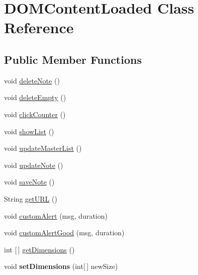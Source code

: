 \hypertarget{class_d_o_m_content_loaded}{}\section{D\+O\+M\+Content\+Loaded Class Reference}
\label{class_d_o_m_content_loaded}
\subsection*{Public Member Functions}
\begin{DoxyCompactItemize}
\item 
void \hyperlink{class_d_o_m_content_loaded_a08ab37a8c435636cf376a8748dce6f25}{delete\+Note} ()
\item 
void \hyperlink{class_d_o_m_content_loaded_a0b00bc687c3f7bee87eccb2aa0e99098}{delete\+Empty} ()
\item 
void \hyperlink{class_d_o_m_content_loaded_a3ada13c27e30a7921dc6de3d0928b8d6}{click\+Counter} ()
\item 
void \hyperlink{class_d_o_m_content_loaded_af7fd8c7ac1052d50a2d2b3186fa69017}{show\+List} ()
\item 
void \hyperlink{class_d_o_m_content_loaded_a6773451115f563a93a7d52016971004d}{update\+Master\+List} ()
\item 
void \hyperlink{class_d_o_m_content_loaded_a5a228b78a1c8a952b3304f9ec596a026}{update\+Note} ()
\item 
void \hyperlink{class_d_o_m_content_loaded_a9680fdf9c56b8536fa5788873cb7e020}{save\+Note} ()
\item 
String \hyperlink{class_d_o_m_content_loaded_a03e60e64122c80b6dd06c48cc727345a}{get\+U\+RL} ()
\item 
void \hyperlink{class_d_o_m_content_loaded_ab11d12ac2eac7f2fce7f06c31917594e}{custom\+Alert} (msg, duration)
\item 
void \hyperlink{class_d_o_m_content_loaded_a838d84f4bc0238418ceee1cc4bffd1ea}{custom\+Alert\+Good} (msg, duration)
\item 
int \mbox{[}$\,$\mbox{]} \hyperlink{class_d_o_m_content_loaded_a9797857671c83a1d837a7e7f2e81254c}{get\+Dimensions} ()
\item 
\mbox{\label{class_d_o_m_content_loaded_a471bf149a746ebc6a3e6e8b9bde76138}} 
void {\bfseries set\+Dimensions} (int\mbox{[}$\,$\mbox{]} new\+Size)
\item 
\mbox{\label{class_d_o_m_content_loaded_acaf3f6278828a563a45e69580cee09f6}} 

\end{DoxyCompactItemize}
